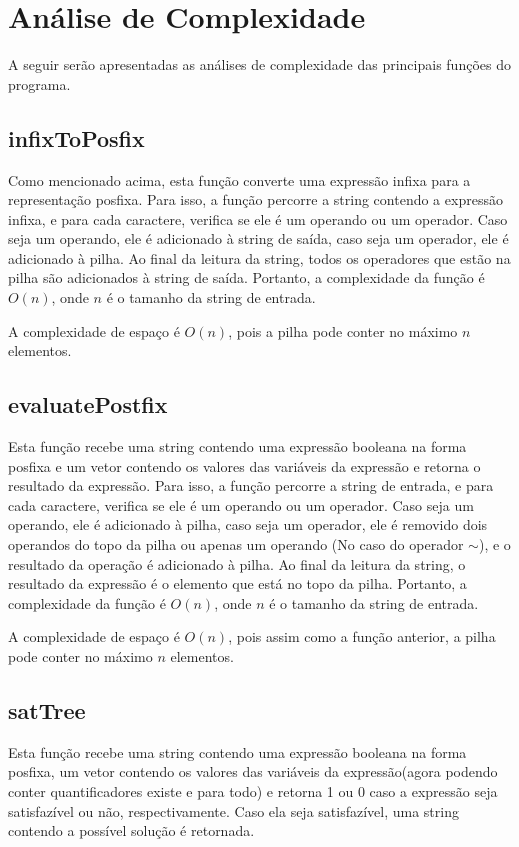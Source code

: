 \documentclass{article}
\begin{document}
\section{Análise de Complexidade}

A seguir serão apresentadas as análises de complexidade das principais funções do programa.

\subsection{infixToPosfix}
Como mencionado acima, esta função converte uma expressão infixa para a representação posfixa. Para isso, a função percorre a string contendo a expressão infixa, e para cada caractere, verifica se ele é um operando ou um operador. Caso seja um operando, ele é adicionado à string de saída, caso seja um operador, ele é adicionado à pilha. Ao final da leitura da string, todos os operadores que estão na pilha são adicionados à string de saída. Portanto, a complexidade da função é $O(n)$, onde $n$ é o tamanho da string de entrada.

A complexidade de espaço é $O(n)$, pois a pilha pode conter no máximo $n$ elementos.

\subsection{evaluatePostfix}
Esta função recebe uma string contendo uma expressão booleana na forma posfixa e um vetor contendo os valores das variáveis da expressão e retorna o resultado da expressão. Para isso, a função percorre a string de entrada, e para cada caractere, verifica se ele é um operando ou um operador. Caso seja um operando, ele é adicionado à pilha, caso seja um operador, ele é removido dois operandos do topo da pilha ou apenas um operando (No caso do operador $\sim$), e o resultado da operação é adicionado à pilha. Ao final da leitura da string, o resultado da expressão é o elemento que está no topo da pilha. Portanto, a complexidade da função é $O(n)$, onde $n$ é o tamanho da string de entrada.

A complexidade de espaço é $O(n)$, pois assim como a função anterior, a pilha pode conter no máximo $n$ elementos.

\subsection{satTree}
Esta função recebe uma string contendo uma expressão booleana na forma posfixa, um vetor contendo os valores das variáveis da expressão(agora podendo conter quantificadores existe e para todo) e retorna 1 ou 0 caso a expressão seja satisfazível ou não, respectivamente. Caso ela seja satisfazível, uma string contendo a possível solução é retornada. 
\end{document}

